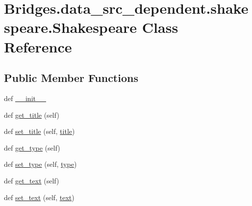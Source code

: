 \hypertarget{class_bridges_1_1data__src__dependent_1_1shakespeare_1_1_shakespeare}{}\section{Bridges.\+data\+\_\+src\+\_\+dependent.\+shakespeare.\+Shakespeare Class Reference}
\label{class_bridges_1_1data__src__dependent_1_1shakespeare_1_1_shakespeare}
\subsection*{Public Member Functions}
\begin{DoxyCompactItemize}
\item 
def \hyperlink{class_bridges_1_1data__src__dependent_1_1shakespeare_1_1_shakespeare_a2a9eed316cf9f7625b03e05774eae0e3}{\+\_\+\+\_\+init\+\_\+\+\_\+}
\item 
def \hyperlink{class_bridges_1_1data__src__dependent_1_1shakespeare_1_1_shakespeare_a0fdb32b02f35dcc7f3227017a2124ac6}{get\+\_\+title} (self)
\item 
def \hyperlink{class_bridges_1_1data__src__dependent_1_1shakespeare_1_1_shakespeare_adfdb16bcf11697cfbf121eaa4f51ed68}{set\+\_\+title} (self, \hyperlink{class_bridges_1_1data__src__dependent_1_1shakespeare_1_1_shakespeare_a72a89a4c8f50b874bc10c34957045402}{title})
\item 
def \hyperlink{class_bridges_1_1data__src__dependent_1_1shakespeare_1_1_shakespeare_ab729e184be5d66ed3b629fca263f7f00}{get\+\_\+type} (self)
\item 
def \hyperlink{class_bridges_1_1data__src__dependent_1_1shakespeare_1_1_shakespeare_ad297741721f3b07259245b90e4cd0e9f}{set\+\_\+type} (self, \hyperlink{class_bridges_1_1data__src__dependent_1_1shakespeare_1_1_shakespeare_ab0f52b854da1eadbe76a160cc0af2eec}{type})
\item 
def \hyperlink{class_bridges_1_1data__src__dependent_1_1shakespeare_1_1_shakespeare_a28b14da48592a67879ede567df99cec7}{get\+\_\+text} (self)
\item 
def \hyperlink{class_bridges_1_1data__src__dependent_1_1shakespeare_1_1_shakespeare_a4cc1e8ccf87e5465575997225d1bf378}{set\+\_\+text} (self, \hyperlink{class_bridges_1_1data__src__dependent_1_1shakespeare_1_1_shakespeare_ad24a2f07ad2841d91796c9fb886a328c}{text})
\end{DoxyCompactItemize}
